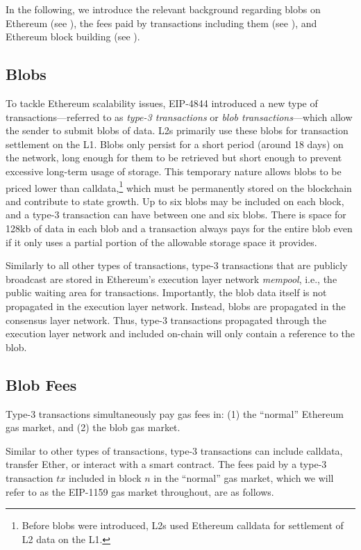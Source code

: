 In the following, we introduce the relevant background regarding blobs on Ethereum (see ), the fees paid by transactions including them (see ), and Ethereum block building (see ).

\subsection{Blobs}
\label{subsec:intro_blobs}
To tackle Ethereum scalability issues, EIP-4844 introduced a new type of transactions---referred to as \textit{type-3 transactions} or \textit{blob transactions}---which allow the sender to submit blobs of data. L2s primarily use these blobs for transaction settlement on the L1. Blobs only persist for a short period (around 18 days) on the network, long enough for them to be retrieved but short enough to prevent excessive long-term usage of storage. This temporary nature allows blobs to be priced lower than calldata,\footnote{Before blobs were introduced, L2s used Ethereum calldata for settlement of L2 data on the L1.} which must be permanently stored on the blockchain and contribute to state growth. Up to six blobs may be included on each block, and a type-3 transaction can have between one and six blobs. There is space for 128kb of data in each blob and a transaction always pays for the entire blob even if it only uses a partial portion of the allowable storage space it provides.

Similarly to all other types of transactions, type-3 transactions that are publicly broadcast are stored in Ethereum's execution layer network \textit{mempool}, i.e., the public waiting area for transactions. Importantly, the blob data itself is not propagated in the execution layer network. Instead, blobs are propagated in the consensus layer network. Thus, type-3 transactions propagated through the execution layer network and included on-chain will only contain a reference to the blob.


\subsection{Blob Fees}\label{subsec:blob_fees}
Type-3 transactions simultaneously pay gas fees in: (1) the ``normal'' Ethereum gas market, and (2) the blob gas market.

Similar to other types of transactions, type-3 transactions can include calldata, transfer Ether, or interact with a smart contract. The fees paid by a type-3 transaction $tx$ included in block $n$ in the ``normal'' gas market, which we will refer to as the EIP-1159 gas market throughout, are as follows.

